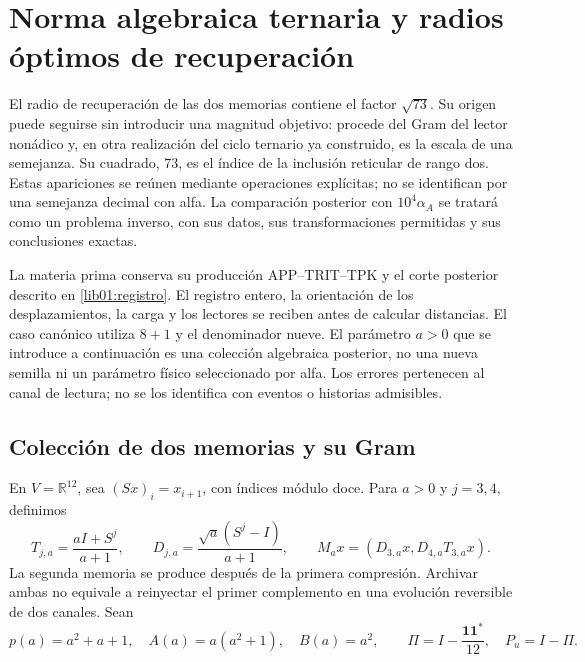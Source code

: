\section{Norma algebraica ternaria y radios óptimos de recuperación}
\label{lib02:norma-ternaria}

El radio de recuperación de las dos memorias contiene el factor
\(\sqrt{73}\). Su origen puede seguirse sin introducir una magnitud
objetivo: procede del Gram del lector nonádico y, en otra realización del
ciclo ternario ya construido, es la escala de una semejanza. Su cuadrado,
\(73\), es el índice de la inclusión reticular de rango dos. Estas
apariciones se reúnen mediante operaciones explícitas;
no se identifican por una semejanza decimal con alfa. La comparación
posterior con \(10^4\alpha_A\) se tratará como un problema inverso,
con sus datos, sus transformaciones permitidas y sus conclusiones exactas.

La materia prima conserva su producción APP--TRIT--TPK y el corte
posterior descrito en \cref{lib01:registro}. El registro entero, la
orientación de los desplazamientos, la carga y los lectores se reciben
antes de calcular distancias. El caso canónico utiliza \(8+1\) y el
denominador nueve. El parámetro \(a>0\) que se introduce a continuación
es una colección algebraica posterior, no una nueva semilla ni un parámetro
físico seleccionado por alfa. Los errores pertenecen al canal de lectura;
no se los identifica con eventos o historias admisibles.

\subsection{Colección de dos memorias y su Gram}
\label{lib02:familia-memoria}

En \(V=\mathbb R^{12}\), sea \((Sx)_i=x_{i+1}\), con índices módulo
doce. Para \(a>0\) y \(j=3,4\), definimos
\begin{equation}
 T_{j,a}=\frac{aI+S^j}{a+1},\qquad
 D_{j,a}=\frac{\sqrt a(S^j-I)}{a+1},\qquad
 M_ax=(D_{3,a}x,D_{4,a}T_{3,a}x).
 \label{lib02:lectores}
\end{equation}
La segunda memoria se produce después de la primera compresión. Archivar
ambas no equivale a reinyectar el primer complemento en una evolución
reversible de dos canales. Sean
\[
 p(a)=a^2+a+1,\quad A(a)=a(a^2+1),\quad B(a)=a^2,
 \qquad\Pi=I-\frac{\mathbf1\mathbf1^*}{12},\quad P_u=I-\Pi.
\]

